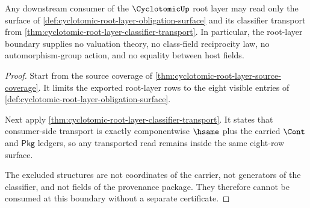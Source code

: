 \begin{theorem}
\label{thm:cyclotomic-root-layer-consumer-boundary}
Any downstream consumer of the $\CyclotomicUp$ root layer may read only the
surface of \autoref{def:cyclotomic-root-layer-obligation-surface} and its
classifier transport from
\autoref{thm:cyclotomic-root-layer-classifier-transport}. In particular, the
root-layer boundary supplies no valuation theory, no class-field reciprocity
law, no automorphism-group action, and no equality between host fields.
\end{theorem}
\begin{proof}
Start from the source coverage of
\autoref{thm:cyclotomic-root-layer-source-coverage}. It limits the exported
root-layer rows to the eight visible entries of
\autoref{def:cyclotomic-root-layer-obligation-surface}.

Next apply \autoref{thm:cyclotomic-root-layer-classifier-transport}. It states
that consumer-side transport is exactly componentwise $\hsame$ plus the carried
$\Cont$ and $\mathsf{Pkg}$ ledgers, so any transported read remains inside the
same eight-row surface.

The excluded structures are not coordinates of the carrier, not generators of
the classifier, and not fields of the provenance package. They therefore cannot
be consumed at this boundary without a separate certificate.
\end{proof}

